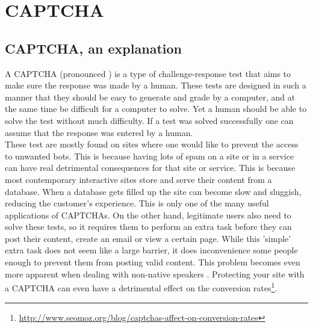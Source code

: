 \documentclass[pdftex,a4paper,12pt,twoside]{report}
\theoremstyle{plain} \newtheorem{theorem}{Theorem} \newtheorem{proposition}{Proposition} \newtheorem{lemma}{Lemma} \newtheorem*{corollary}{Corollary}
\theoremstyle{definition} \newtheorem{definition}{Definition} \newtheorem{conjecture}{Conjecture} \newtheorem*{example}{Example} \newtheorem{algorithm}{Algorithm}
\theoremstyle{remark} \newtheorem*{remark}{Remark} \newtheorem*{note}{Note} \newtheorem{case}{Case}
\begin{document}
\section{CAPTCHA}
\label{sec:captcha}
\subsection{CAPTCHA, an explanation}
A CAPTCHA (pronounced ) is a type of challenge-response test that aims to make sure the response was made by a human. These tests are designed in such a manner that they should be easy to generate and grade by a computer, and at the same time be difficult for a computer to solve. Yet a human should be able to solve the test without much difficulty. If a test was solved successfully one can assume that the response was entered by a human.\\These test are mostly found on sites where one would like to prevent the access to unwanted bots. This is because having lots of spam on a site or in a service can have real detrimental consequences for that site or service. This is because most contemporary interactive sites store and serve their content from a database. When a database gets filled up the site can become slow and sluggish, reducing the customer's experience. This is only one of the many useful applications of CAPTCHAs. On the other hand, legitimate users also need to solve these tests, so it requires them to perform an extra task before they can post their content, create an email or view a certain page. While this 'simple' extra task does not seem like a large barrier, it does inconvenience some people enough to prevent them from posting valid content. This problem becomes even more apparent when dealing with non-native speakers \citep{Banday2011}. Protecting your site with a CAPTCHA can even have a detrimental effect on the conversion rates\footnote{\url{http://www.seomoz.org/blog/captchas-affect-on-conversion-rates}}.
\end{document}
